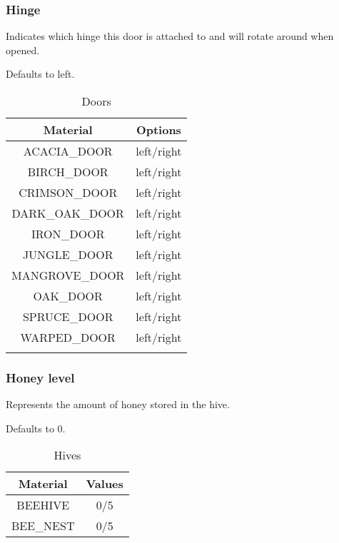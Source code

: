 \subsubsection{Hinge}\label{spigot-types:hinge}
Indicates which hinge this door is attached to and will rotate around when opened.

Defaults to left.

\begin{longtable}{ |c|c| }
	\hline
	Material & Options \\
	\hline
	\endhead
	ACACIA\_DOOR & left/right \\
	BIRCH\_DOOR & left/right \\
	CRIMSON\_DOOR & left/right \\
	DARK\_OAK\_DOOR & left/right \\
	IRON\_DOOR & left/right \\
	JUNGLE\_DOOR & left/right \\
	MANGROVE\_DOOR & left/right \\
	OAK\_DOOR & left/right \\
	SPRUCE\_DOOR & left/right \\
	WARPED\_DOOR & left/right \\
	\hline
	\caption{Doors}
\end{longtable}

\subsubsection{Honey level}
Represents the amount of honey stored in the hive.

Defaults to 0.

\begin{table}[H]
	\centering
	\begin{tabular}{ |c|c| }
		\hline
		Material & Values \\
		\hline
		BEEHIVE & 0/5\footnotemark \\
		BEE\_NEST & 0/5\footnotemark[\value{footnote}] \\ %
		\hline
	\end{tabular}
	\caption{Hives}
\end{table}


